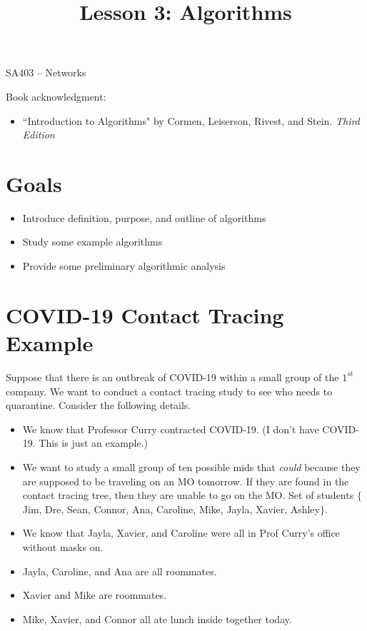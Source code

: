 \documentclass[12pt]{article}
\makeatletter
\theoremstyle{definition}
\newcommand{\graphbox}[5]%
{
\begin{tikzpicture}
     [>=latex,scale=#5]
     
     \draw [->,very thick] (#1, 0) -- (#2, 0) node[right] {$x$};
     \draw [->,very thick] (0, #3) -- (0, #4) node[above] {$y$};
     
     \draw[step=1cm,thick,dotted] (#1,#3) grid (#2,#4);
   \end{tikzpicture}
   }
\renewcommand{\maketitle}{
  \noindent SA403 -- Networks \\

  \begin{center}\Large{\textbf{\@title}}\end{center}
}
\makeatother
\begin{document}

\title{Lesson 3: Algorithms}


\maketitle



Book acknowledgment:
\begin{itemize}
	\item[]  ``Introduction to Algorithms" by Cormen, Leiserson, Rivest, and Stein. \emph{Third Edition}
\end{itemize}
\section*{Goals}
\begin{itemize}
\item Introduce definition, purpose, and outline of algorithms
\item Study some example algorithms
\item Provide some preliminary algorithmic analysis
\end{itemize}

\section{COVID-19 Contact Tracing Example}

Suppose that there is an outbreak of COVID-19 within a small group of the $1^{st}$ company. We want to conduct a contact tracing study to see who needs to quarantine. Consider the following details.

\begin{itemize}
	\item We know that Professor Curry contracted COVID-19. (I don't have COVID-19. This is just an example.)
	\item We want to study a small group of ten possible mids that \emph{could} because they are supposed to be traveling on an MO tomorrow. If they are found in the contact tracing tree, then they are unable to go on the MO. Set of students $\{$Jim, Dre, Sean, Connor, Ana, Caroline, Mike, Jayla, Xavier, Ashley$\}$. 
	\item We know that Jayla, Xavier, and Caroline were all in Prof Curry's office without masks on.
	\item Jayla, Caroline, and Ana are all roommates.
	\item Xavier and Mike are roommates.
	\item Mike, Xavier, and Connor all ate lunch inside together today.
\end{itemize}
\newpage
\end{document}
